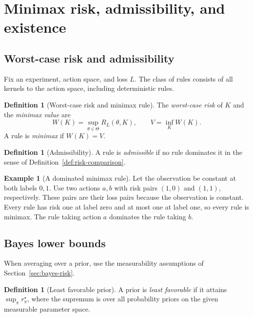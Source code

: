 \documentclass[11pt,oneside]{book}
\theoremstyle{definition}
\newtheorem{definition}[theorem]{Definition}
\newtheorem{example}[theorem]{Example}
\theoremstyle{remark}
\begin{document}
\clearpage
\section{Minimax risk, admissibility, and existence}
\label{sec:minimax-admissibility}

\subsection{Worst-case risk and admissibility}
\label{subsec:worst-case-risk}

Fix an experiment, action space, and loss $L$. The class of rules consists
of all kernels to the action space, including deterministic rules.

\begin{definition}[Worst-case risk and minimax rule]
\label{def:minimax-rule}
The \emph{worst-case risk} of $K$ and the \emph{minimax value} are
\[
W(K)=\sup_{\theta\in\Theta}R_L(\theta,K),\qquad
V=\inf_K W(K).
\]
A rule is \emph{minimax} if $W(K)=V$.
\end{definition}

\begin{definition}[Admissibility]
\label{def:admissibility}
A rule is \emph{admissible} if no rule dominates it in the sense of
Definition~\ref{def:risk-comparison}.
\end{definition}

\begin{example}[A dominated minimax rule]
\label{ex:dominated-minimax}
Let the observation be constant at both labels $0,1$. Use two actions
$a,b$ with risk pairs $(1,0)$ and $(1,1)$, respectively. These pairs are
their loss pairs because the observation is constant. Every rule
has risk one at label zero and at most one at label one, so every rule
is minimax. The rule taking action $a$ dominates the rule taking $b$.
\end{example}

\subsection{Bayes lower bounds}
\label{subsec:bayes-minimax-bound}

When averaging over a prior, use the measurability assumptions of
Section~\ref{sec:bayes-risk}.

\begin{definition}[Least favorable prior]
\label{def:least-favorable-prior}
A prior is \emph{least favorable} if it attains $\sup_\pi r_\pi^\star$,
where the supremum is over all probability priors on the given
measurable parameter space.
\end{definition}
\end{document}
